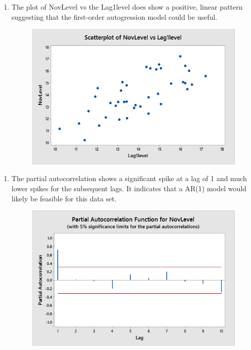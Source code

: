 \documentclass{article}
\providecommand{\tightlist}{%
      \setlength{\itemsep}{0pt}\setlength{\parskip}{0pt}}
\begin{document}
\begin{enumerate}
\def\labelenumi{\alph{enumi})}
\setcounter{enumi}{1}
\tightlist
\item
  The plot of NovLevel vs the Lag1level does show a positive, linear
  pattern suggesting that the first-order autogression model could be
  useful.
  
  \begin{figure}[h!]
 \centering
 \includegraphics[scale=.45]{./images/scatterplot_NovLevel-vs-Lag1Level.png}
\end{figure}

\end{enumerate}

\newpage
\begin{enumerate}
\def\labelenumi{\alph{enumi})}
\setcounter{enumi}{2}
\tightlist
\item
  The partial autocorrelation shows a significant spike at a lag of 1
  and much lower spikes for the subsequent lags. It indicates that a
  AR(1) model would likely be feasible for this data set.
  
  \begin{figure}[h!]
 \centering
 \includegraphics[scale=.45]{./images/PACF_novLevel.png}
\end{figure}

\end{enumerate}
\end{document}
